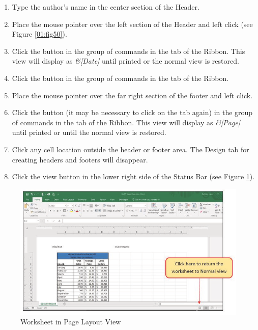 \begin{enumerate}[resume]
	\item Type the author's name in the center section of the Header.
	\item Place the mouse pointer over the left section of the Header and left click (see Figure \ref{01:fig50}).
	\item Click the  button in the  group of commands in the  tab of the Ribbon. This view will display as \textit{\&[Date]} until printed or the normal view is restored.
	\item Click the  button in the  group of commands in the  tab of the Ribbon.
	\item Place the mouse pointer over the far right section of the footer and left click.
	\item Click the  button (it may be necessary to click on the  tab again) in the  group of commands in the  tab of the Ribbon. This view will display as \textit{\&[Page]} until printed or until the normal view is restored.
	\item Click any cell location outside the header or footer area. The Design tab for creating headers and footers will disappear.
	\item Click the  view button in the lower right side of the Status Bar (see Figure \ref{01:fig51}).

\end{enumerate}

\begin{figure}[H]
	\centering
	\includegraphics[width=\maxwidth{.95\linewidth}]{gfx/ch01_fig51}
	\caption{Worksheet in Page Layout View}
	\label{01:fig51}
\end{figure}

